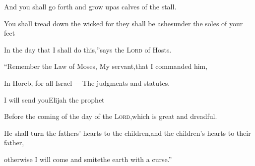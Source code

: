 \begin{inparaenum}
  \pb And you shall go forth and grow up\pa as calves of the stall.%
  
  \pa {} You shall tread down the wicked for they shall be ashes\pa under the soles of your feet%
  
  \pb In the day that I shall do this,''\pa says the \textsc{Lord} of Hosts.%
  
  \pa {}%
  ``Remember the Law of Moses, My servant,\pa that I commanded him,%
  
  \pb In Horeb, for all Israel~---\pa The judgments and statutes.%
  
  \pa {}%
  I will send you\pa Elijah the prophet%
  
  \pb Before the coming of the day of the \textsc{Lord},\pa which is great and dreadful.%
  
  \pa {}%
  He shall turn the fathers' hearts to the children,\pa and the children's hearts to their father,%
  
  \pb otherwise I will come and smite\pa the earth with a curse.''%
\end{inparaenum}

